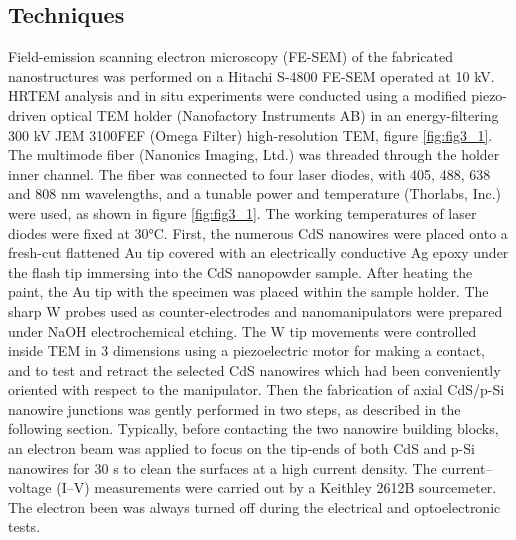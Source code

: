 \subsection{Techniques}
Field-emission scanning electron microscopy (FE-SEM) of the fabricated nanostructures was performed on a Hitachi S-4800 FE-SEM operated at 10 kV. HRTEM analysis and in situ experiments were conducted using a modified piezo-driven optical TEM holder (Nanofactory Instruments AB) in an energy-filtering 300 kV JEM 3100FEF (Omega Filter) high-resolution TEM, figure \ref{fig:fig3_1}. The multimode fiber (Nanonics Imaging, Ltd.) was threaded through the holder inner channel. The fiber was connected to four laser diodes, with 405, 488, 638 and 808 nm wavelengths, and a tunable power and temperature (Thorlabs, Inc.) were used, as shown in figure \ref{fig:fig3_1}. The working temperatures of laser diodes were fixed at 30°C. First, the numerous CdS nanowires were placed onto a fresh-cut flattened Au tip covered with an electrically conductive Ag epoxy under the flash tip immersing into the CdS nanopowder sample. After heating the paint, the Au tip with the specimen was placed within the sample holder. The sharp W probes used as counter-electrodes and nanomanipulators were prepared under NaOH electrochemical etching. The W tip movements were controlled inside TEM in 3 dimensions using a piezoelectric motor for making a contact, and to test and retract the selected CdS nanowires which had been conveniently oriented with respect to the manipulator. Then the fabrication of axial CdS/p-Si nanowire junctions was gently performed in two steps, as described in the following section. Typically, before contacting the two nanowire building blocks, an electron beam was applied to focus on the tip-ends of both CdS and p-Si nanowires for 30 s to clean the surfaces at a high current density. The current–voltage (I–V) measurements were carried out by a Keithley 2612B sourcemeter. The electron been was always turned off during the electrical and optoelectronic tests. 

